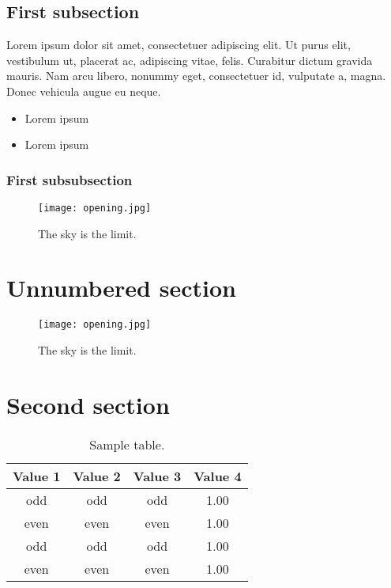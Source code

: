 \documentclass[12pt]{article}
\begin{document}
\subsection{First subsection}
\lipsum[1]

\leftboxbegin
Lorem ipsum dolor sit amet, consectetuer adipiscing elit. Ut purus elit, vestibulum ut, placerat ac, adipiscing vitae, felis. Curabitur dictum gravida mauris. Nam arcu libero, nonummy eget, consectetuer id, vulputate a, magna. Donec vehicula augue eu neque. 
\leftboxend

\lipsum[1-2]

\rightboxbegin
\begin{itemize}
 \item Lorem ipsum
 \item Lorem ipsum
\end{itemize}
\rightboxend

\lipsum[1]

\subsubsection{First subsubsection}

\lipsum[1]

\begin{figure}[!h]
\centering
\texttt{[image: opening.jpg]}
\caption{The sky is the limit.}
\end{figure}

\section*{Unnumbered section}
\lipsum[1]

\begin{figure}[!h]
\centering
\texttt{[image: opening.jpg]}
\caption*{The sky is the limit.}
\end{figure}

\section{Second section}

\lipsum[1]
\begin{table}[!h]
\centering
\caption{Sample table.}
\begin{tabular}{cccc}
\toprule
Value 1 & Value 2 & Value 3 & Value 4\\
\midrule
 odd     & odd   & odd & 1.00 \\
 even    & even  & even& 1.00 \\
 odd     & odd   & odd & 1.00 \\
 even    & even  & even& 1.00 \\
\bottomrule
\end{tabular}
\end{table}

\lipsum[1]

\lipsum[1]
\frameboxend
\end{document}
